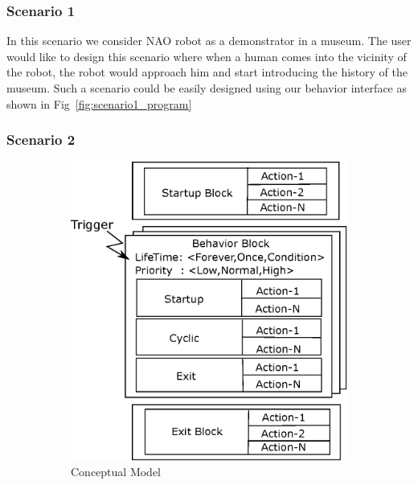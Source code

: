 \documentclass{llncs}
\begin{document}
\subsubsection{Scenario 1}
%
In this scenario we consider NAO robot as a demonstrator in a museum. The user would like to design this scenario where when a human comes into the vicinity of the robot, the robot would approach him and start introducing the history of the museum. Such a scenario could be easily designed using our behavior interface as shown in Fig~\ref{fig:scenario1_program}
%
\subsubsection{Scenario 2}
%
\begin{figure}
\centering
\begin{subfigure}[t]{0.48\textwidth}
\includegraphics[width=\textwidth]{../thesis/assets/program_structure.eps}
\caption[Conceptual Model]{Conceptual Model}
\label{fig:scenario2_program}
\end{subfigure}
\begin{subfigure}[t]{0.48\textwidth}

\end{subfigure}
\end{figure}
\end{document}
